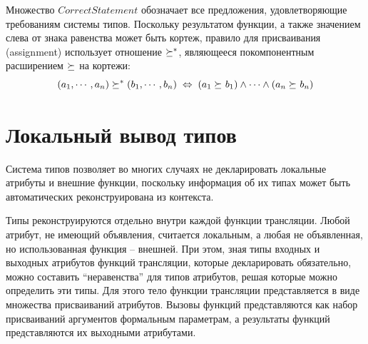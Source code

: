 Множество $CorrectStatement$ обозначает все предложения, удовлетворяющие требованиям системы типов. Поскольку результатом функции, а также значением слева от знака равенства может быть кортеж, правило для присваивания (assignment) использует отношение $\succeq_{}^*$, являющееся покомпонентным расширением $\succeq_{}$ на кортежи:
$$(a_1,\cdots,a_n)\succeq_{}^*(b_1,\cdots,b_n)
	\;\Leftrightarrow\; 
(a_1 \succeq_{} b_1) \wedge \cdots \wedge (a_n \succeq_{} b_n)$$

\section{Локальный вывод типов}

Система типов \ATF{} позволяет во многих случаях не декларировать локальные атрибуты и внешние функции, поскольку информация об их типах может быть автоматических реконструирована из контекста. 

Типы реконструируются отдельно внутри каждой функции трансляции. Любой атрибут, не имеющий объявления, считается локальным, а любая не объявленная, но использованная функция -- внешней. При этом, зная типы входных и выходных атрибутов функций трансляции, которые декларировать обязательно, можно составить ``неравенства'' для типов атрибутов, решая которые можно определить эти типы.
Для этого тело функции трансляции представляется в виде множества присваиваний атрибутов. Вызовы функций представляются как набор присваиваний аргументов формальным параметрам, а результаты функций представляются их выходными атрибутами. 

